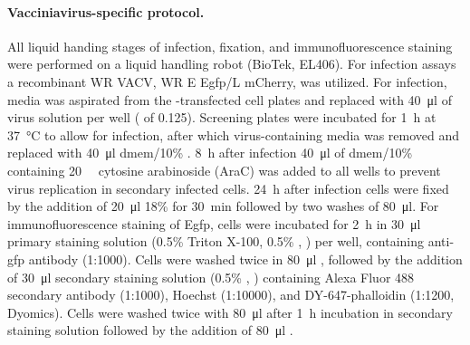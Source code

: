 \paragraph{Vacciniavirus-specific protocol.}
All liquid handing stages of infection, fixation, and immunofluorescence staining were performed on a liquid handling robot (BioTek, EL406). For infection assays a recombinant WR VACV, WR E E\acrshort{gfp}\slash L mCherry, was utilized. For infection, media was aspirated from the -transfected cell plates and replaced with \SI{40}{\micro\litre} of virus solution per well ( of 0.125). Screening plates were incubated for \SI{1}{\hour} at \SI{37}{\celsius} to allow for infection, after which virus-containing media was removed and replaced with \SI{40}{\micro\litre} \acrshort{dmem}\slash 10\% . \SI{8}{\hour} after infection \SI{40}{\micro\litre} of \acrshort{dmem}\slash 10\%  containing \SI{20}{\micro\Molar} cytosine arabinoside (AraC) was added to all wells to prevent virus  replication in secondary infected cells. \SI{24}{\hour} after infection cells were fixed by the addition of \SI{20}{\micro\litre} 18\%  for \SI{30}{\minute} followed by two  washes of \SI{80}{\micro\litre}. For immunofluorescence staining of E\acrshort{gfp}, cells were incubated for \SI{2}{\hour} in \SI{30}{\micro\litre} primary staining solution (0.5\% Triton X-100, 0.5\% , ) per well, containing anti-\acrshort{gfp} antibody (1:1000). Cells were washed twice in \SI{80}{\micro\litre} , followed by the addition of \SI{30}{\micro\litre} secondary staining solution (0.5\% , ) containing Alexa Fluor 488 secondary antibody (1:1000), Hoechst (1:10000), and DY-647-phalloidin (1:1200, Dyomics). Cells were washed twice with \SI{80}{\micro\litre}  after \SI{1}{\hour} incubation in secondary staining solution followed by the addition of \SI{80}{\micro\litre} .


